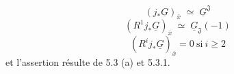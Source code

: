 \begin{equation*}
(j_*\underline{G})_{\bar{x}} \;\simeq\; \underline{G}^{\mathfrak{J}}
\end{equation*}
\begin{equation*}
(R^1 j_*\underline{G})_{\bar{x}} \;\simeq\; \underline{G}_{\mathfrak{J}}(-1)
\end{equation*}
\begin{equation*}
(R^i j_*\underline{G})_{\bar{x}} = 0 \ \text{si} \ i \geq 2
\end{equation*}
et l'assertion résulte de 5.3 (a) et 5.3.1.
